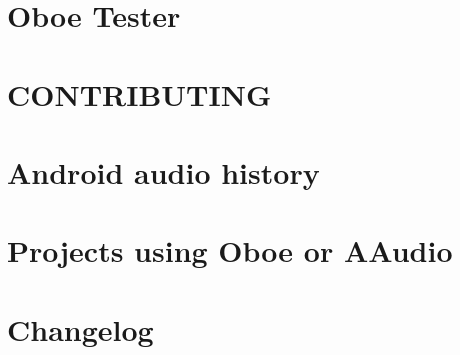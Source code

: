\let\mypdfximage\pdfximage\def\pdfximage{\immediate\mypdfximage}\documentclass[twoside]{book}
\newcommand{\+}{\discretionary{\mbox{\scriptsize$\hookleftarrow$}}{}{}}
\begin{document}
\chapter{Oboe Tester}
\label{md__c_1__users_fab_src__github_branches__neural_amp_modeler_plugin_i_plug2__dependencies__build_c744017d69f18a5bbd438a5a1eec6e5d}

\chapter{C\+O\+N\+T\+R\+I\+B\+U\+T\+I\+NG}
\label{md__c_1__users_fab_src__github_branches__neural_amp_modeler_plugin_i_plug2__dependencies__build_f614b3962db0a4eefb4d8763b34ad5e0}

\chapter{Android audio history}
\label{md__c_1__users_fab_src__github_branches__neural_amp_modeler_plugin_i_plug2__dependencies__build_a4defb466d0c71177ee6c250b750bbeb}

\chapter{Projects using Oboe or A\+Audio}
\label{md__c_1__users_fab_src__github_branches__neural_amp_modeler_plugin_i_plug2__dependencies__build_a07c06e94144f0c896ea0b7c8c4b9f59}

\chapter{Changelog}
\label{md__c_1__users_fab_src__github_branches__neural_amp_modeler_plugin_i_plug2__dependencies__build_987f6b604e9746e3c411c328a9674f51}

\end{document}
